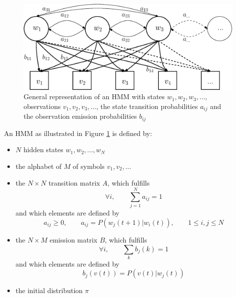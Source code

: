 \documentclass[a4paper, oneside]{csthesis}
\begin{document}
\begin{figure}[tb]
    \begin{center}
        \includegraphics[width=\textwidth]{figures/hmm-general-model.eps}
    \end{center}
    \caption{General representation of an HMM with states $w_1, w_2, w_3, ...$, observations $v_1, v_2, v_3, ...$, the state transition probabilities $a_{ij}$ and the observation emission probabilities $b_{ij}$}
    \label{fig:hmm-general-model}
\end{figure}


An HMM as illustrated in Figure \ref{fig:hmm-general-model} is defined by:

\begin{itemize}
 \item $N$ hidden states $w_1, w_2, ..., w_N$
 \item the alphabet of $M$ of symbols $v_1, v_2, ...$
 \item the $N\times N$ transition matrix $A$, which fulfills
 $$\forall i,\qquad \sum_{j=1}^{N} a_{ij} = 1$$
 and which elements are defined by
 $$a_{ij} \geq 0, \qquad a_{ij} = P(w_j(t+1)|w_i(t)), \qquad 1 \leq i,j \leq N$$

 \item the $N \times M$ emission matrix $B$, which fulfills
 $$\forall i,\qquad \sum_k b_j(k) = 1 $$
 and which elements are defined by
 $$b_j(v(t)) = P(v(t)|w_j(t))$$

 \item the initial distribution $\pi$
\end{itemize}
\end{document}
